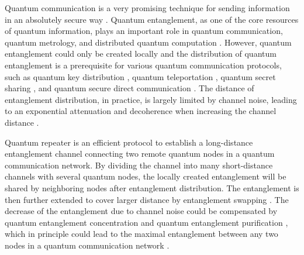\documentclass[aps,graphicx,twocolumn]{revtex4}%
\begin{document}

Quantum communication is a very promising technique for sending
information in an absolutely secure way \cite{Quaninternet}. Quantum
entanglement, as one of the core resources of quantum information,
plays an important role in quantum communication, quantum metrology,
and distributed quantum computation
\cite{nielsen2000,QMee,DisQC1,DisQC2,DisQC3,DisQC33,DisQC4}.
However, quantum entanglement could only be created locally and the
distribution of quantum entanglement is  a prerequisite for various
quantum communication protocols, such as quantum key distribution
\cite{ekert1991,bennett1992a,LiaoPanQKD,Lo2014QKD}, quantum
teleportation \cite{telep1,RenPanteleportation}, quantum secret
sharing \cite{QSS0,QSS1,QSS2}, and  quantum secure direct
communication \cite{QSDC1,QSDC2,QSDC3,QSDC6,QSDC5,QSDC7}. The
distance of entanglement distribution, in practice, is largely
limited by channel noise, leading to an exponential attenuation and
decoherence when increasing the channel distance \cite{nielsen2000}.



Quantum repeater \cite{QR0,QR1,QR2} is an efficient protocol to
establish a long-distance entanglement channel connecting two remote
quantum nodes in a quantum communication network. By dividing the
channel into many short-distance channels with several quantum
nodes, the locally created entanglement will be shared by
neighboring nodes after entanglement distribution. The entanglement
is then further extended to cover larger distance by entanglement
swapping \cite{QS0,QS1,QS2,QS3}. The decrease of the entanglement
due to  channel noise could be compensated by  quantum entanglement
concentration
\cite{ECP1B,ECP1add1,ECP1add2,Eccs1,Eccs2,ECP1add3,Eccl1,Eccl2} and
quantum entanglement purification
\cite{EPP1B,Qerrer,EPPpan01,EPPpan2,EPPSheng1,EPPpdeng1}, which in
principle could lead to the maximal entanglement between any two
nodes in a quantum communication network \cite{Quaninternet}.
\end{document}
